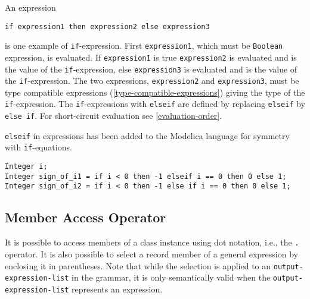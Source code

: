 An expression
\begin{lstlisting}[language=modelica]
if expression1 then expression2 else expression3
\end{lstlisting}%
 is one example of \lstinline!if!-expression.
First \lstinline!expression1!, which must be \lstinline!Boolean! expression, is evaluated.
If \lstinline!expression1! is true \lstinline!expression2! is evaluated and is the value of the \lstinline!if!-expression, else \lstinline!expression3! is evaluated and is the value of the \lstinline!if!-expression.
The two expressions, \lstinline!expression2! and \lstinline!expression3!, must be type compatible expressions (\cref{type-compatible-expressions}) giving the type of the \lstinline!if!-expression.
The \lstinline!if!-expressions with \lstinline!elseif! are defined by replacing \lstinline!elseif! by \lstinline!else if!.
For short-circuit evaluation see \cref{evaluation-order}.

\begin{nonnormative}
\lstinline!elseif! in expressions has been added to the Modelica language for symmetry with \lstinline!if!-equations.
\end{nonnormative}

\begin{example}
\begin{lstlisting}[language=modelica]
Integer i;
Integer sign_of_i1 = if i < 0 then -1 elseif i == 0 then 0 else 1;
Integer sign_of_i2 = if i < 0 then -1 else if i == 0 then 0 else 1;
\end{lstlisting}
\end{example}

\subsection{Member Access Operator}\label{member-access-operator}

It is possible to access members of a class instance using dot notation, i.e., the \lstinline!.! operator.
It is also possible to select a record member of a general expression by enclosing it in parentheses.
Note that while the selection is applied to an \lstinline[language=grammar]!output-expression-list! in the grammar, it is only semantically valid when the \lstinline[language=grammar]!output-expression-list! represents an expression.

